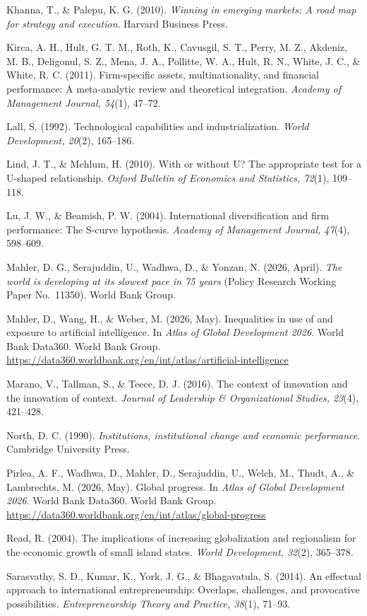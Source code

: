 \documentclass[
  12pt]{article}
\begin{document}
Khanna, T., \& Palepu, K. G. (2010). \emph{Winning in emerging markets:
A road map for strategy and execution}. Harvard Business Press.

Kirca, A. H., Hult, G. T. M., Roth, K., Cavusgil, S. T., Perry, M. Z.,
Akdeniz, M. B., Deligonul, S. Z., Mena, J. A., Pollitte, W. A., Hult, R.
N., White, J. C., \& White, R. C. (2011). Firm-specific assets,
multinationality, and financial performance: A meta-analytic review and
theoretical integration. \emph{Academy of Management Journal, 54}(1),
47--72.

Lall, S. (1992). Technological capabilities and industrialization.
\emph{World Development, 20}(2), 165--186.

Lind, J. T., \& Mehlum, H. (2010). With or without U? The appropriate
test for a U-shaped relationship. \emph{Oxford Bulletin of Economics and
Statistics, 72}(1), 109--118.

Lu, J. W., \& Beamish, P. W. (2004). International diversification and
firm performance: The S-curve hypothesis. \emph{Academy of Management
Journal, 47}(4), 598--609.

Mahler, D. G., Serajuddin, U., Wadhwa, D., \& Yonzan, N. (2026, April).
\emph{The world is developing at its slowest pace in 75 years} (Policy
Research Working Paper No.~11350). World Bank Group.

Mahler, D., Wang, H., \& Weber, M. (2026, May). Inequalities in use of
and exposure to artificial intelligence. In \emph{Atlas of Global
Development 2026}. World Bank Data360. World Bank Group.
\url{https://data360.worldbank.org/en/int/atlas/artificial-intelligence}

Marano, V., Tallman, S., \& Teece, D. J. (2016). The context of
innovation and the innovation of context. \emph{Journal of Leadership \&
Organizational Studies, 23}(4), 421--428.

North, D. C. (1990). \emph{Institutions, institutional change and
economic performance}. Cambridge University Press.

Pirlea, A. F., Wadhwa, D., Mahler, D., Serajuddin, U., Welch, M., Thudt,
A., \& Lambrechts, M. (2026, May). Global progress. In \emph{Atlas of
Global Development 2026}. World Bank Data360. World Bank Group.
\url{https://data360.worldbank.org/en/int/atlas/global-progress}

Read, R. (2004). The implications of increasing globalization and
regionalism for the economic growth of small island states. \emph{World
Development, 32}(2), 365--378.

Sarasvathy, S. D., Kumar, K., York, J. G., \& Bhagavatula, S. (2014). An
effectual approach to international entrepreneurship: Overlaps,
challenges, and provocative possibilities. \emph{Entrepreneurship Theory
and Practice, 38}(1), 71--93.
\end{document}
